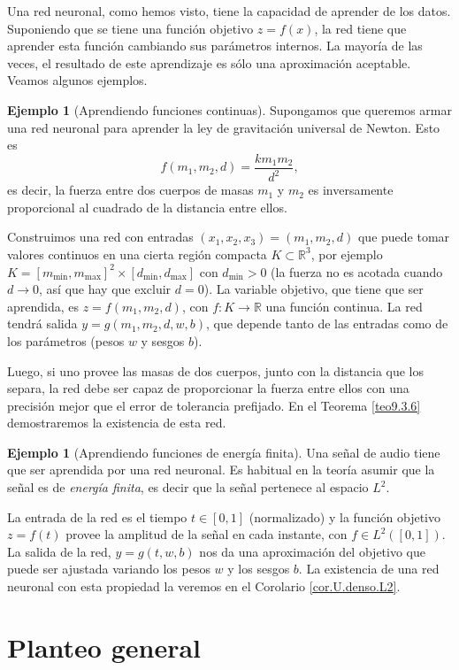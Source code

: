 \documentclass[12pt, a4paper]{amsbook}
\newcommand{\R}{{\mathbb R}}
\theoremstyle{remark}
\theoremstyle{definition}
\newtheorem{ejem}[teo]{Ejemplo}
\numberwithin{section}{chapter}
\numberwithin{subsection}{section}
\numberwithin{equation}{section}
\numberwithin{figure}{chapter}
\begin{document}
Una red neuronal, como hemos visto, tiene la capacidad de aprender de los datos. Suponiendo que se tiene una función objetivo $z=f(x)$, la red tiene que aprender esta función cambiando sus parámetros internos. La mayoría de las veces, el resultado de este aprendizaje es sólo una aproximación aceptable. Veamos algunos ejemplos.

\begin{ejem}[Aprendiendo funciones continuas]
Supongamos que queremos armar una red neuronal para aprender la ley de gravitación universal de Newton. Esto es
$$
f(m_1, m_2, d) = \frac{k m_1 m_2}{d^2},
$$
es decir, la fuerza entre dos cuerpos de masas $m_1$ y $m_2$ es inversamente proporcional al cuadrado de la distancia entre ellos.

Construimos una red con entradas $(x_1, x_2, x_3) = (m_1, m_2, d)$ que puede tomar valores continuos en una cierta región compacta $K\subset \R^3$, por ejemplo $K=[m_{\min},m_{\max}]^2\times[d_{\min},d_{\max}]$ con $d_{\min}>0$ (la fuerza no es acotada cuando $d\to0$, así que hay que excluir $d=0$). La variable objetivo, que tiene que ser aprendida, es $z=f(m_1, m_2, d)$, con $f\colon K\to\R$ una función continua. La red tendrá salida $y=g(m_1, m_2, d, w, b)$, que depende tanto de las entradas como de los parámetros (pesos $w$ y sesgos $b$).

Luego, si uno provee las masas de dos cuerpos, junto con la distancia que los separa, la red debe ser capaz de proporcionar la fuerza entre ellos con una precisión mejor que el error de tolerancia prefijado. En el Teorema \ref{teo9.3.6} demostraremos la existencia de esta red.
\end{ejem}

\begin{ejem}[Aprendiendo funciones de energía finita]
Una señal de audio tiene que ser aprendida por una red neuronal. Es habitual en la teoría asumir que la señal es de {\em energía finita}, es decir que la señal pertenece al espacio $L^2$.

La entrada de la red es el tiempo $t\in[0,1]$ (normalizado) y la función objetivo $z=f(t)$ provee la amplitud de la señal en cada instante, con $f\in L^2([0,1])$. La salida de la red, $y=g(t, w, b)$ nos da una aproximación del objetivo que puede ser ajustada variando los pesos $w$ y los sesgos $b$. La existencia de una red neuronal con esta propiedad la veremos en el Corolario \ref{cor.U.denso.L2}.
\end{ejem}


\section{Planteo general}\label{sec.c9.2}
\end{document}

